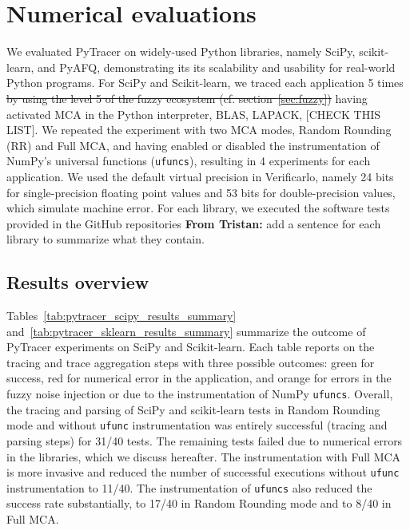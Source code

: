 \documentclass[11pt]{article}
\newcommand{\tristan}[1]{\color{orange}\textbf{From Tristan:} #1\color{black}\xspace}
\newcommand{\tristanmod}[2]{\color{orange}\sout{#1} #2\color{black}\xspace}
\newcommand{\pytracer}[0]{PyTracer\xspace}
\begin{document}
\section{Numerical evaluations}

We evaluated \pytracer on widely-used Python libraries, namely SciPy, scikit-learn, and PyAFQ, demonstrating its its scalability and usability for real-world Python programs.  For SciPy and Scikit-learn, we traced each application 5 times \tristanmod{by using the level 5 of the fuzzy ecosystem (cf. section~\ref{sec:fuzzy})}{ having activated MCA in the Python interpreter, BLAS, LAPACK, [CHECK THIS LIST]}. We repeated the experiment with two MCA modes, Random Rounding (RR) and Full MCA, and having enabled or disabled the instrumentation of NumPy's universal functions (\texttt{ufuncs}),
resulting in 4 experiments for each application. We used the default virtual precision in Verificarlo, namely 24 bits for single-precision floating point values and 53 bits for double-precision values, which simulate machine error. For each library, we executed the software tests provided in the GitHub repositories \tristan{add a sentence for each library to summarize what they contain}. 

\subsection{Results overview}

Tables~\ref{tab:pytracer_scipy_results_summary} and~\ref{tab:pytracer_sklearn_results_summary} summarize 
the outcome of \pytracer experiments on SciPy and Scikit-learn.
Each table reports on the tracing and trace aggregation steps with three possible outcomes: green for success, red for numerical error in the application, and orange for errors in the fuzzy noise injection or due to the instrumentation of NumPy \texttt{ufuncs}. Overall, the tracing and parsing of SciPy and scikit-learn tests in Random Rounding mode and without \texttt{ufunc} instrumentation was entirely successful (tracing and parsing steps) for 31/40 tests. The remaining tests failed due to numerical errors in the libraries, which we discuss hereafter. The instrumentation with Full MCA is more invasive and reduced the number of successful executions without \texttt{ufunc} instrumentation to 11/40.  The instrumentation of \texttt{ufuncs} also reduced the success rate substantially, to 17/40 in Random Rounding mode and to 8/40 in Full MCA. 
\end{document}
